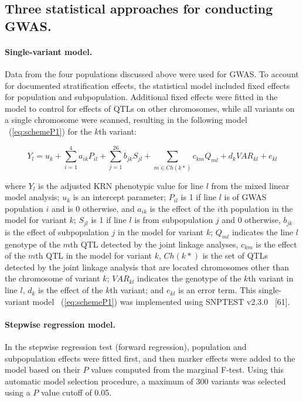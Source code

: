 \documentclass[10pt,letterpaper]{article}
\begin{document}
\subsection*{Three statistical approaches for conducting GWAS.}
\paragraph{Single-variant model.} 
Data from the four populations discussed above were used for GWAS. To account for documented stratification effects, the statistical model included fixed effects for population and subpopulation. Additional fixed effects were fitted in the model to control for effects of QTLs on other chromosomes, while all variants on a single chromosome were scanned, resulting in the following model ~(\ref{eq:schemeP1}) for the $k$th variant:  

\begin{equation}\label{eq:schemeP1} 
Y_l = u_k + \sum_{i=1}^{4}a_{ik}P_{il} + \sum_{j=1}^{26} b_{jk}S_{jl} + \sum_{m \in Ch(k*)}c_{km}Q_{ml} + d_kVAR_{kl} + e_{kl}
\end{equation}


where $Y_l$ is the adjusted KRN phenotypic value for line $l$ from the mixed linear model analysis; $u_k$ is an intercept parameter; $P_{il}$ is 1 if line $l$ is of GWAS population $i$ and is 0 otherwise, and $a_{ik}$ is the effect of the $i$th population in the model for variant $k$; $S_{jl}$ is 1 if line $l$ is from subpopulation $j$ and 0 otherwise, $b_{jk}$ is the effect of subpopulation $j$ in the model for variant $k$; $Q_{ml}$ indicates the line $l$ genotype of the $m$th QTL detected by the joint linkage analyses, $c_{km}$ is the effect of the $m$th QTL in the model for variant $k$, $Ch(k*)$ is the set of QTLs detected by the joint linkage analysis that are located chromosomes other than the chromosome of variant $k$; $VAR_{kl}$ indicates the genotype of the $k$th variant in line $l$, $d_k$ is the effect of the $k$th variant; and $e_{kl}$ is an error term. This single-variant model ~(\ref{eq:schemeP1}) was implemented using SNPTEST v2.3.0 ~\cite{Marchini2010}[61].

\paragraph{Stepwise regression model.} 
In the stepwise regression test (forward regression), population and subpopulation effects were fitted first, and then marker effects were added to the model based on their $P$ values computed from the marginal F-test. Using this automatic model selection procedure, a maximum of 300 variants was selected using a $P$ value cutoff of 0.05.
\end{document}
